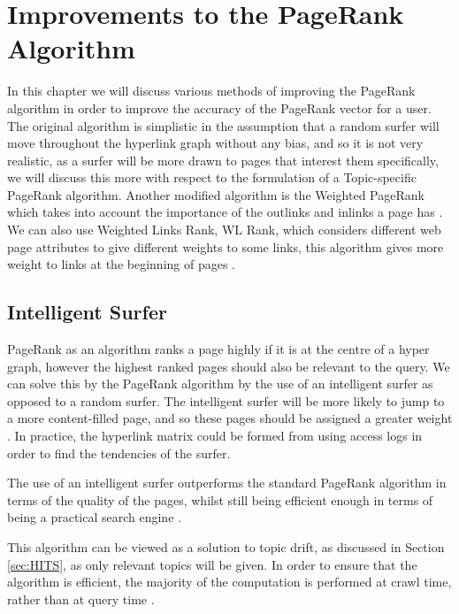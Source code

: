 \documentclass[11pt]{report}
\begin{document}
\chapter{Improvements to the PageRank Algorithm} \label{chap:Improve}

In this chapter we will discuss various methods of improving the PageRank algorithm in order to improve the accuracy of the PageRank vector for a user. The original algorithm is simplistic in the assumption that a random surfer will move throughout the hyperlink graph without any bias, and so it is not very realistic, as a surfer will be more drawn to pages that interest them specifically, we will discuss this more with respect to the formulation of a Topic-specific PageRank algorithm. Another modified algorithm is the Weighted PageRank which takes into account the importance of the outlinks and inlinks a page has \cite{xing2004weighted}. We can also use Weighted Links Rank, WL Rank, which considers different web page attributes to give different weights to some links, this algorithm gives more weight to links at the beginning of pages \cite{baeza2004web}.

\section{Intelligent Surfer} \label{sec:intelligent}
PageRank as an algorithm ranks a page highly if it is at the centre of a hyper graph, however the highest ranked pages should also be relevant to the query. We can solve this by the PageRank algorithm by the use of an intelligent surfer as opposed to a random surfer. The intelligent surfer will be more likely to jump to a more content-filled page, and so these pages should be assigned a greater weight \cite{langville}. In practice, the hyperlink matrix could be formed from using access logs in order to find the tendencies of the surfer. 

The use of an intelligent surfer outperforms the standard PageRank algorithm in terms of the quality of the pages, whilst still being efficient enough in terms of being a practical search engine \cite{richardson2002intelligent}. 

This algorithm can be viewed as a solution to topic drift, as discussed in Section \ref{sec:HITS}, as only relevant topics will be  given. In order to ensure that the algorithm is efficient, the majority of the computation is performed at crawl time, rather than at query time \cite{richardson2002intelligent}. 
\end{document}
